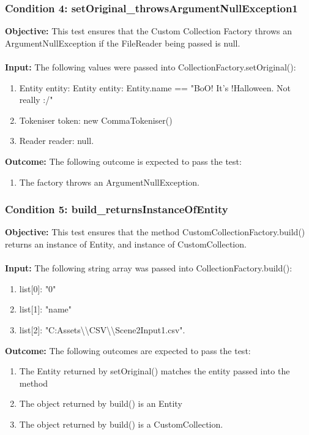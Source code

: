 \documentclass[a4paper,12pt]{article}
\begin{document}
		\subsubsection{Condition 4: setOriginal\_throwsArgumentNullException1}
			\textbf{Objective:} This test ensures that the Custom Collection Factory throws an ArgumentNullException if the FileReader being passed is null.\\\\
			\textbf{Input:} The following values were passed into CollectionFactory.setOriginal():
				\begin{enumerate}
					\item Entity entity: Entity entity: Entity.name == "BoO! It's !Halloween. Not really :/"
					\item Tokeniser token: new CommaTokeniser()
					\item Reader reader: null.
				\end{enumerate}
			\textbf{Outcome:} The following outcome is expected to pass the test:
				\begin{enumerate}
					\item The factory throws an ArgumentNullException.
				\end{enumerate}
		\subsubsection{Condition 5: build\_returnsInstanceOfEntity}
			\textbf{Objective:} This test ensures that the method CustomCollectionFactory.build() returns an instance of Entity, and instance of CustomCollection.\\\\
			\textbf{Input:} The following string array was passed into CollectionFactory.build():
				\begin{enumerate}
					\item list[0]: "0"
					\item list[1]: "name"
					\item list[2]: "C:Assets\textbackslash \textbackslash CSV\textbackslash \textbackslash Scene2Input1.csv".
				\end{enumerate}
			\textbf{Outcome:} The following outcomes are expected to pass the test:
				\begin{enumerate}
					\item The Entity returned by setOriginal() matches the entity passed into the method
					\item The object returned by build() is an Entity
					\item The object returned by build() is a CustomCollection.
				\end{enumerate}
\end{document}

